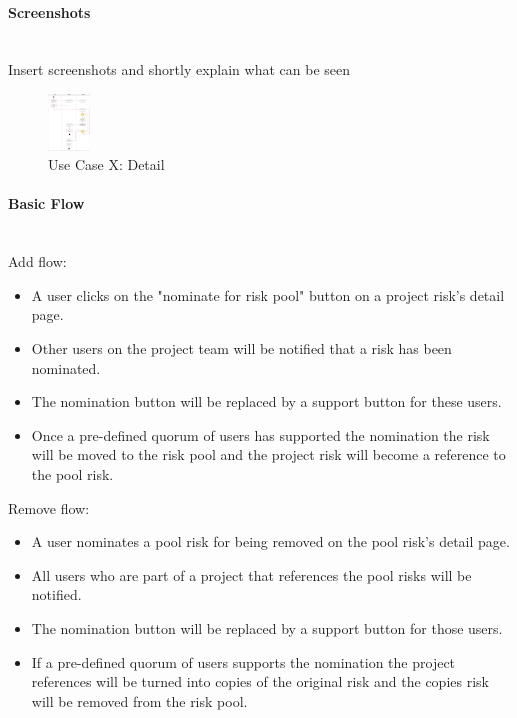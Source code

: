 \paragraph*{Screenshots}\mbox{}\\
Insert screenshots and shortly explain what can be seen
\begin{figure}[h] 
	\centering
	\includegraphics[width=0.1\textwidth]{Content/Domain/UC5RiskPoolDiagram.png}
	\caption{Use Case X: Detail}
	\label{fig:label5}
\end{figure}

\paragraph*{Basic Flow} \mbox{}\\
Add flow:
\begin{itemize}
	\vspace{-3mm}
	\setlength\itemsep{-1em}
	\item A user clicks on the "nominate for risk pool" button on a project risk's detail page.
	\item Other users on the project team will be notified that a risk has been nominated.
	\item The nomination button will be replaced by a support button for these users.
	\item Once a pre-defined quorum of users has supported the nomination the risk will be moved to the risk pool and the project risk will become a reference to the pool risk.
\end{itemize}

Remove flow:
\begin{itemize}
	\vspace{-3mm}
	\setlength\itemsep{-1em}
	\item A user nominates a pool risk for being removed on the pool risk's detail page.
	\item All users who are part of a project that references the pool risks will be notified.
	\item The nomination button will be replaced by a support button for those users.
	\item If a pre-defined quorum of users supports the nomination the project references will be turned into copies of the original risk and the copies risk will be removed from the risk pool.
\end{itemize}

